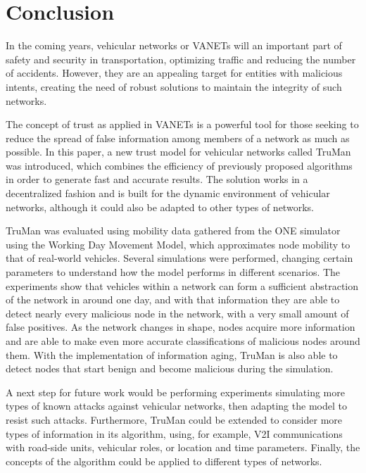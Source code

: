\chapter{Conclusion}
\label{chap:conclusion}

In the coming years, vehicular networks or VANETs will an important part of safety and security in transportation, optimizing traffic and reducing the number of accidents.
However, they are an appealing target for entities with malicious intents, creating the need of robust solutions to maintain the integrity of such networks.

The concept of trust as applied in VANETs is a powerful tool for those seeking to reduce the spread of false information among members of a network as much as possible.
In this paper, a new trust model for vehicular networks called TruMan was introduced, which combines the efficiency of previously proposed algorithms in order to generate fast and accurate results.
The solution works in a decentralized fashion and is built for the dynamic environment of vehicular networks, although it could also be adapted to other types of networks.


TruMan was evaluated using mobility data gathered from the ONE simulator using the Working Day Movement Model, which approximates node mobility to that of real-world vehicles.
Several simulations were performed, changing certain parameters to understand how the model performs in different scenarios.
The experiments show that vehicles within a network can form a sufficient abstraction of the network in around one day, and with that information they are able to detect nearly every malicious node in the network, with a very small amount of false positives.
As the network changes in shape, nodes acquire more information and are able to make even more accurate classifications of malicious nodes around them.
With the implementation of information aging, TruMan is also able to detect nodes that start benign and become malicious during the simulation.

A next step for future work would be performing experiments simulating more types of known attacks against vehicular networks, then adapting the model to resist such attacks.
Furthermore, TruMan could be extended to consider more types of information in its algorithm, using, for example, V2I communications with road-side units, vehicular roles, or location and time parameters.
Finally, the concepts of the algorithm could be applied to different types of networks.

